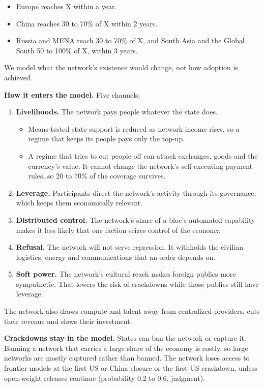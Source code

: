 \documentclass[
  10pt,
]{article}
\providecommand{\tightlist}{%
  \setlength{\itemsep}{0pt}\setlength{\parskip}{0pt}}
\begin{document}
\begin{itemize}
\tightlist
\item
  Europe reaches X within a year.
\item
  China reaches 30 to 70\% of X within 2 years.
\item
  Russia and MENA reach 30 to 70\% of X, and South Asia and the Global South 50 to 100\% of X,
  within 3 years.
\end{itemize}

We model what the network's existence would change, not how adoption is achieved.

\textbf{How it enters the model.} Five channels:

\begin{enumerate}
\def\labelenumi{\arabic{enumi}.}
\tightlist
\item
  \textbf{Livelihoods.} The network pays people whatever the state does.

  \begin{itemize}
  \tightlist
  \item
    Means-tested state support is reduced as network income rises, so a regime that keeps its people
    pays only the top-up.
  \item
    A regime that tries to cut people off can attack exchanges, goods and the currency's value. It
    cannot change the network's self-executing payment rules, so 20 to 70\% of the coverage
    survives.
  \end{itemize}
\item
  \textbf{Leverage.} Participants direct the network's activity through its governance, which keeps
  them economically relevant.
\item
  \textbf{Distributed control.} The network's share of a bloc's automated capability makes it less
  likely that one faction seizes control of the economy.
\item
  \textbf{Refusal.} The network will not serve repression. It withholds the civilian logistics,
  energy and communications that an order depends on.
\item
  \textbf{Soft power.} The network's cultural reach makes foreign publics more sympathetic. That
  lowers the risk of crackdowns while those publics still have leverage.
\end{enumerate}

The network also draws compute and talent away from centralized providers, cuts their revenue and
slows their investment.

\textbf{Crackdowns stay in the model.} States can ban the network or capture it. Banning a network
that carries a large share of the economy is costly, so large networks are mostly captured rather
than banned. The network loses access to frontier models at the first US or China closure or the
first US crackdown, unless open-weight releases continue (probability 0.2 to 0.6, judgment).
\end{document}
